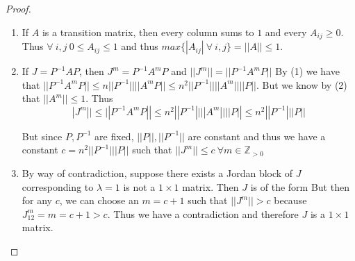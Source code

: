 \documentclass{amsart}
\theoremstyle{definition}
\theoremstyle{remark}
\numberwithin{equation}{section}
\begin{document}
\begin{proof}

\begin{enumerate}


	\item 
		If $A$ is a transition matrix, then every column sums to $1$ and every $A_{ij} \geq 0$.
		Thus $\forall\ i, j\ 0 \leq A_{ij} \leq 1$ and thus $ max \{|A_{ij}|\ \forall\ i, j \} = ||A|| \leq 1$.


	\item
		If $J = P^{-1}AP$, then $J^m  = P^{-1}A^mP$ and $||J^m|| = || P^{-1}A^mP ||$
		By (1) we have that $|| P^{-1}A^mP || \leq n||P^{-1}||||A^mP|| \leq n^2 ||P^{-1}|| ||A^m||| |P||$.
		But we know by (2) that $||A^m|| \leq 1$.
		Thus 
		$$ |J^m|| \leq || P^{-1}A^mP || \leq n^2 ||P^{-1}|| ||A^m||| |P|| \leq n^2 ||P^{-1}|| |P||$$

		But since $P, P^{-1}$ are fixed, $||P||, ||P^{-1}||$ are constant and thus we have a constant $c = n^2 ||P^{-1}|| |P||$ such that $||J^m|| \leq c\ \forall m \in \mathbb{Z}_{>0}$

		


	\item 
		By way of contradiction, suppose there exists a  Jordan block of $J$ corresponding to $\lambda = 1$ is not a $1 \times 1 $ matrix.
		Then $J$ is of the form 
		But then for any $c$, we can choose an $m = c +1$ such that $||J^m|| > c$ because $J_{12}^m = m = c+1 > c$.
		Thus we have a contradiction and therefore $J$ is a $1 \times 1$ matrix.


\end{enumerate}


\begin{comment}



	We know that $A$ has eigenvalue $1$ by Theorem 5.17 \cite{friedberg2003linear} and the characteristic polynomial of $A$ splits because $C$ is an algebraically closed field. 


	Thus by Theorem 7.4 \cite{friedberg2003linear}, we know $\forall\ 1 \leq i \leq k$, $dim(K_{1})$ is the multiplicity of $1$ as an eigenvalue of $A$.
	Additionally, we know $E_{\lambda} \subseteq K_{\lambda}$ by Theorem 7.1.

	But if each Jordan block of $J$ corresponding to the eigenvalue $\lambda = 1$ is a $1 \times 1$ matrix, then $dim(K_1) = 1$.
	But if $E_{\lambda} \subseteq K_1$, then $dim(E_{\lambda}) = 1$.	






\end{comment}

\end{proof}
\end{document}
